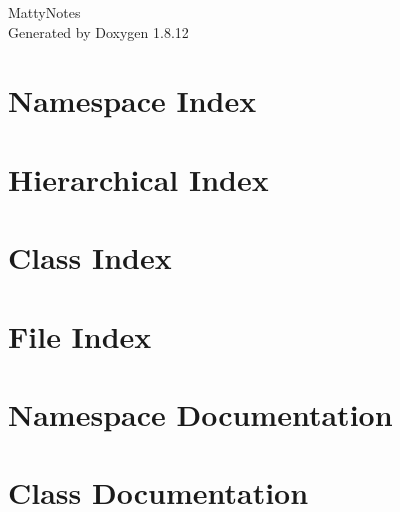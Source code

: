 \documentclass[twoside]{book}
\newcommand{\+}{\discretionary{\mbox{\scriptsize$\hookleftarrow$}}{}{}}
\newcommand{\clearemptydoublepage}{%
  \newpage{\pagestyle{empty}\cleardoublepage}%
}
\begin{document}
\hypersetup{pageanchor=false,
             bookmarksnumbered=true,
             pdfencoding=unicode
            }
\begin{titlepage}
\vspace*{7cm}
\begin{center}%
{\Large Matty\+Notes }\\
\vspace*{1cm}
{\large Generated by Doxygen 1.8.12}\\
\end{center}
\end{titlepage}
\clearemptydoublepage
{}
\tableofcontents
\clearemptydoublepage
{}
\hypersetup{pageanchor=true}

\chapter{Namespace Index}

\chapter{Hierarchical Index}

\chapter{Class Index}

\chapter{File Index}

\chapter{Namespace Documentation}

\chapter{Class Documentation}





















\end{document}
